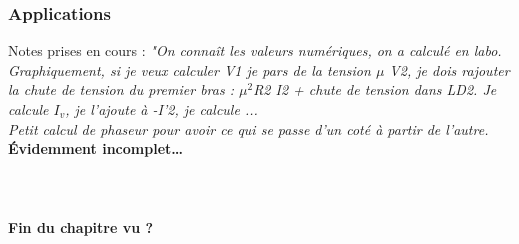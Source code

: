 		\subsubsection{Applications}
		Notes prises en cours : \textit{"On connaît les valeurs numériques, 
		on a calculé en labo. Graphiquement, si je veux calculer V1 je pars 
		de la tension $\mu$ V2, je dois rajouter la chute de tension du 
		premier bras : $\mu^2$R2 I2 + chute de tension dans LD2. Je calcule 
		$I_v$, je l'ajoute à -I'2, je calcule ...\\
		Petit calcul de phaseur pour avoir ce qui se passe d'un coté à partir 
		de l'autre.}\\
		\textbf{Évidemment incomplet\dots}\\
		\\
		\\
		\\
		\textbf{Fin du chapitre vu ?}